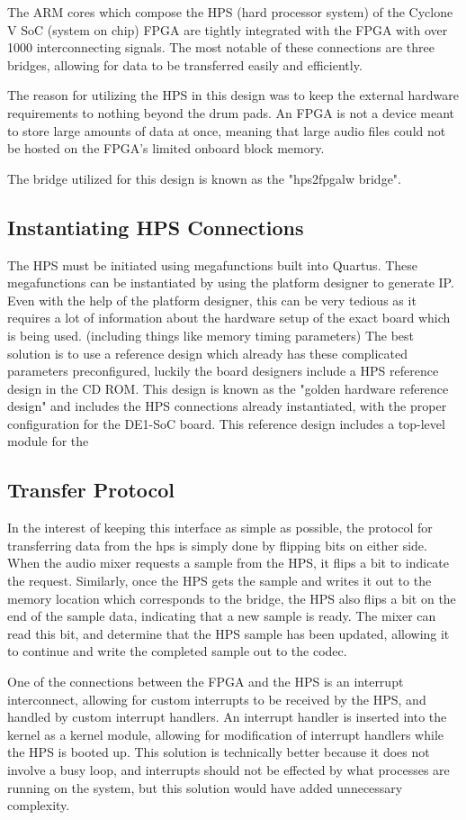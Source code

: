\documentclass{subfile}
\begin{document}
  The ARM cores which compose the HPS (hard processor system) of the Cyclone V SoC (system on chip) FPGA 
  are tightly integrated with the FPGA with over 1000 interconnecting signals. %
  The most notable of these connections are three bridges, allowing for data to be transferred 
  easily and efficiently.

  The reason for utilizing the HPS in this design was to keep the external hardware requirements 
  to nothing beyond the drum pads. 
  An FPGA is not a device meant to store large amounts of data at once, meaning that large audio 
  files could not be hosted on the FPGA's limited onboard block memory.

  The bridge utilized for this design is known as the "hps2fpgalw bridge". 
  
  \subsection{Instantiating HPS Connections}
  The HPS must be initiated using megafunctions built into Quartus. 
  These megafunctions can be instantiated by using the platform designer to generate IP.
  Even with the help of the platform designer, this can be very tedious as it requires a lot of 
  information about the hardware setup of the exact board which is being used. (including things like memory timing parameters) 
  The best solution is to use a reference design which already has these complicated parameters 
  preconfigured, luckily the board designers include a HPS reference design in the CD ROM. 
  This design is known as the "golden hardware reference design" and includes the HPS connections 
  already instantiated, with the proper configuration for the DE1-SoC board.
  This reference design includes a top-level module for the 

  \subsection{Transfer Protocol} 
  In the interest of keeping this interface as simple as possible, the protocol for transferring 
  data from the hps is simply done by flipping bits on either side.
  When the audio mixer requests a sample from the HPS, it flips a bit to indicate the request.
  Similarly, once the HPS gets the sample and writes it out to the memory location which corresponds to 
  the bridge, the HPS also flips a bit on the end of the sample data, indicating that a new sample 
  is ready. 
  The mixer can read this bit, and determine that the HPS sample has been updated, allowing it to continue and 
  write the completed sample out to the codec.

  One of the connections between the FPGA and the HPS is an interrupt interconnect, allowing for custom interrupts 
  to be received by the HPS, and handled by custom interrupt handlers. 
  An interrupt handler is inserted into the kernel as a kernel module, allowing for modification of interrupt handlers 
  while the HPS is booted up. 
  This solution is technically better because it does not involve a busy loop, and interrupts should not be effected by 
  what processes are running on the system, but this solution would have added unnecessary complexity.
\end{document}
